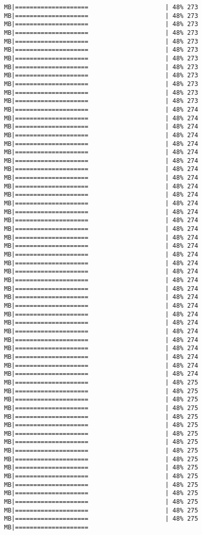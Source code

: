 \documentclass[
]{article}
\begin{document}
\begin{verbatim}
MB|====================                     | 48% 273 MB|====================                     | 48% 273 MB|====================                     | 48% 273 MB|====================                     | 48% 273 MB|====================                     | 48% 273 MB|====================                     | 48% 273 MB|====================                     | 48% 273 MB|====================                     | 48% 273 MB|====================                     | 48% 273 MB|====================                     | 48% 273 MB|====================                     | 48% 273 MB|====================                     | 48% 273 MB|====================                     | 48% 274 MB|====================                     | 48% 274 MB|====================                     | 48% 274 MB|====================                     | 48% 274 MB|====================                     | 48% 274 MB|====================                     | 48% 274 MB|====================                     | 48% 274 MB|====================                     | 48% 274 MB|====================                     | 48% 274 MB|====================                     | 48% 274 MB|====================                     | 48% 274 MB|====================                     | 48% 274 MB|====================                     | 48% 274 MB|====================                     | 48% 274 MB|====================                     | 48% 274 MB|====================                     | 48% 274 MB|====================                     | 48% 274 MB|====================                     | 48% 274 MB|====================                     | 48% 274 MB|====================                     | 48% 274 MB|====================                     | 48% 274 MB|====================                     | 48% 274 MB|====================                     | 48% 274 MB|====================                     | 48% 274 MB|====================                     | 48% 274 MB|====================                     | 48% 274 MB|====================                     | 48% 274 MB|====================                     | 48% 274 MB|====================                     | 48% 274 MB|====================                     | 48% 274 MB|====================                     | 48% 274 MB|====================                     | 48% 274 MB|====================                     | 48% 275 MB|====================                     | 48% 275 MB|====================                     | 48% 275 MB|====================                     | 48% 275 MB|====================                     | 48% 275 MB|====================                     | 48% 275 MB|====================                     | 48% 275 MB|====================                     | 48% 275 MB|====================                     | 48% 275 MB|====================                     | 48% 275 MB|====================                     | 48% 275 MB|====================                     | 48% 275 MB|====================                     | 48% 275 MB|====================                     | 48% 275 MB|====================                     | 48% 275 MB|====================                     | 48% 275 MB|====================                     | 48% 275 MB|====================  
\end{verbatim}
\end{document}
